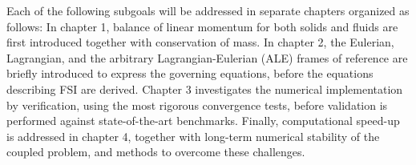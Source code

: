 \newpage

Each of the following subgoals will be addressed in separate chapters organized as follows: In chapter 1, balance of linear momentum for both solids and fluids are first introduced together with conservation of mass. In chapter 2, the Eulerian, Lagrangian, and the arbitrary Lagrangian-Eulerian (ALE) frames of reference are briefly introduced to express the governing equations, before the equations describing FSI are derived. Chapter 3 investigates the numerical implementation by verification, using the most rigorous convergence tests, before validation is performed against state-of-the-art benchmarks. Finally, computational speed-up is addressed in chapter 4, together with long-term numerical stability of the coupled problem, and methods to overcome these challenges.
 
